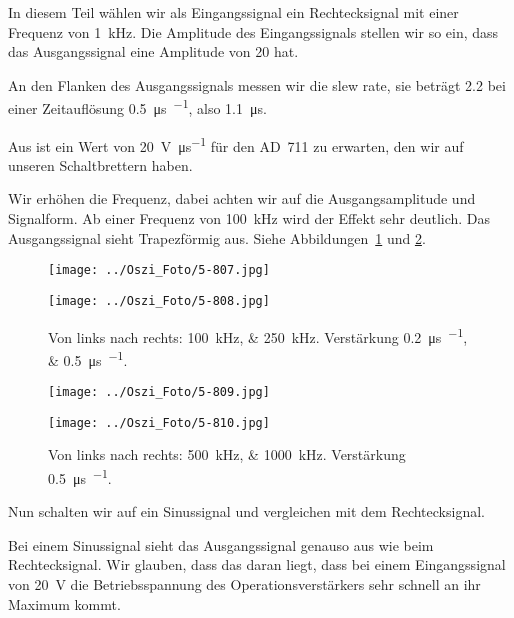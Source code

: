 In diesem Teil wählen wir als Eingangssignal ein Rechtecksignal mit einer
Frequenz von \SI{1}{\kilo\hertz}. Die Amplitude des Eingangssignals stellen wir
so ein, dass das Ausgangssignal eine Amplitude von \SI{20}{\voltss} hat.

An den Flanken des Ausgangssignals messen wir die slew rate, sie beträgt
\SI{2.2}{\division} bei einer Zeitauflösung
\SI{.5}{\micro\second\per\division}, also \SI{1.1}{\micro\second}.

Aus \cite[Tabelle~5/6.1]{physik313-Anleitung} ist ein Wert von
\SI{20}{\volt\per\micro\second} für den AD~711 zu erwarten, den wir auf unseren
Schaltbrettern haben.

Wir erhöhen die Frequenz, dabei achten wir auf die Ausgangsamplitude und
Signalform. Ab einer Frequenz von \SI{100}{\kilo\hertz} wird der Effekt sehr
deutlich. Das Ausgangssignal sieht Trapezförmig aus. Siehe
Abbildungen~\ref{fig:807} und \ref{fig:809}.

\begin{figure}[htbp]
	\centering
	\begin{minipage}{.45\linewidth}
		\texttt{[image: ../Oszi\_Foto/5-807.jpg]}
	\end{minipage}
	\hfill
	\begin{minipage}{.45\linewidth}
		\texttt{[image: ../Oszi\_Foto/5-808.jpg]}
	\end{minipage}
	\caption{%
		Von links nach rechts: \SIlist{100;250}{\kilo\hertz}. Verstärkung
		\SIlist{.2;.5}{\micro\second\per\division}.
	}
	\label{fig:807}
\end{figure}

\begin{figure}[htbp]
	\centering
	\begin{minipage}{.45\linewidth}
		\texttt{[image: ../Oszi\_Foto/5-809.jpg]}
	\end{minipage}
	\hfill
	\begin{minipage}{.45\linewidth}
		\texttt{[image: ../Oszi\_Foto/5-810.jpg]}
	\end{minipage}
	\caption{%
		Von links nach rechts: \SIlist{500;1000}{\kilo\hertz}. Verstärkung
		\SI{.5}{\micro\second\per\division}.
	}
	\label{fig:809}
\end{figure}

Nun schalten wir auf ein Sinussignal und vergleichen mit dem Rechtecksignal.

Bei einem Sinussignal sieht das Ausgangssignal genauso aus wie beim
Rechtecksignal. Wir glauben, dass das daran liegt, dass bei einem
Eingangssignal von \SI{20}{\volt} die Betriebsspannung des
Operationsverstärkers sehr schnell an ihr Maximum kommt.

